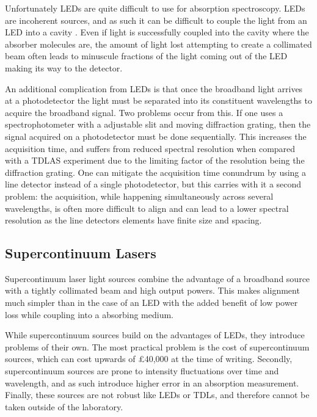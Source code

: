 Unfortunately \acp{LED} are quite difficult to use for absorption
spectroscopy.  \acp{LED} are incoherent sources, and as such it can be
difficult to couple the light from an \ac{LED} into a
cavity \cite{Seetohul:2009du,Islam:2007ea}. Even if light is successfully
coupled into the cavity where the absorber molecules are, the amount of light
lost attempting to create a collimated beam often leads to minuscule fractions
of the light coming out of the \ac{LED} making its way to the detector.

An additional complication from \acp{LED} is that once the broadband light
arrives at a photodetector the light must be separated into its constituent
wavelengths to acquire the broadband signal.  Two problems occur from this. If
one uses a spectrophotometer with a adjustable slit and moving diffraction
grating, then the signal acquired on a photodetector must be done
sequentially.  This increases the acquisition time, and suffers from reduced
spectral resolution when compared with a \ac{TDLAS} experiment due to the
limiting factor of the resolution being the diffraction grating. One can
mitigate the acquisition time conundrum by using a line detector instead of a
single photodetector, but this carries with it a second problem: the
acquisition, while happening simultaneously across several wavelengths, is
often more difficult to align and can lead to a lower spectral resolution as the line detectors elements have finite size and spacing.



\subsection{Supercontinuum Lasers}\label{subsec:super}

Supercontinuum laser light sources combine the advantage of a broadband source
with a tightly collimated beam and high output powers. This makes alignment
much simpler than in the case of an \ac{LED} with the added benefit of low
power loss while coupling into a absorbing medium.

While supercontinuum sources build on the advantages of \acp{LED}, they
introduce problems of their own. The most practical problem is the cost of
supercontinuum sources, which can cost upwards of \pounds40,000 at the time of
writing. Secondly, supercontinuum sources are prone to intensity fluctuations
over time and wavelength, and as such introduce higher error in an absorption
measurement.  Finally, these sources are not robust like \acp{LED} or
\acp{TDL}, and therefore cannot be taken outside of the laboratory.



